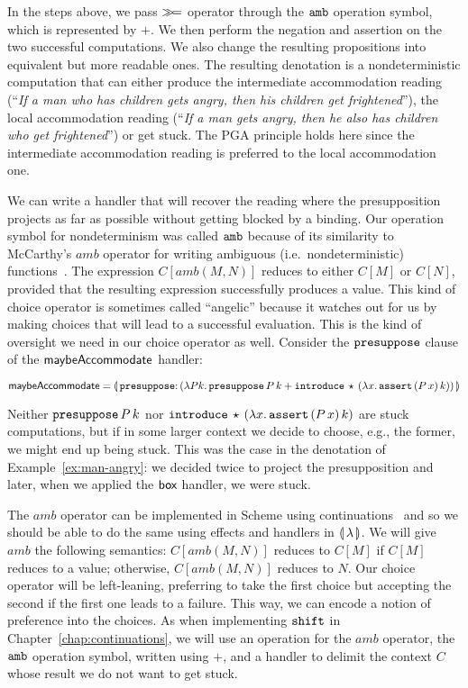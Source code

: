 In the steps above, we pass $\mathbin{\gg\!=}$ operator through the $\mathtt{amb}$
operation symbol, which is represented by $+$. We then perform the negation
and assertion on the two successful computations. We also change the
resulting propositions into equivalent but more readable ones. The
resulting denotation is a nondeterministic computation that can either
produce the intermediate accommodation reading (``\emph{If a man who has
  children gets angry, then his children get frightened}''), the local
accommodation reading (``\emph{If a man gets angry, then he also has
  children who get frightened}'') or get stuck. The PGA principle holds
here since the intermediate accommodation reading is preferred to the local
accommodation one.

We can write a handler that will recover the reading where the
presupposition projects as far as possible without getting blocked by a
binding. Our operation symbol for nondeterminism was called $\mathtt{amb}$
because of its similarity to McCarthy's $amb$ operator for writing
ambiguous (i.e.\ nondeterministic)
functions~\cite{mccarthy1961basis,abelson1996structure}. The expression
$C[amb(M, N)]$ reduces to either $C[M]$ or $C[N]$, provided that the
resulting expression successfully produces a value. This kind of choice
operator is sometimes called ``angelic'' because it watches out for us by
making choices that will lead to a successful evaluation. This is the kind
of oversight we need in our choice operator as well. Consider the
$\mathtt{presuppose}$ clause of the $\textsf{maybeAccommodate}$ handler:

$$
  \maybeAccommodate = \banana{\onto{\op{presuppose}}{(\lam{P k}{
    \app{\op{presuppose}}{P}{k} +
    \app{\op{introduce}}{\star}{(\lam{x}{\app{\op{assert}}{(\ap{P}{x})}{k}})}})}}
$$

Neither $\mathtt{presuppose}\,P\,k$ nor
$\mathtt{introduce}\,\star\,(\lambda x.\, \mathtt{assert}\,(P\,x)\,k)$
are stuck computations, but if in some larger context we decide to choose,
e.g., the former, we might end up being stuck. This was the case in the
denotation of Example~\ref{ex:man-angry}: we decided twice to project the
presupposition and later, when we applied the $\textsf{box}$ handler, we were
stuck.

The $amb$ operator can be implemented in Scheme using
continuations~\cite{sitaram1998teach} and so we should be able to do the
same using effects and handlers in $\llparenthesis \, \lambda \, \rrparenthesis$. We will give $amb$
the following semantics: $C[amb(M, N)]$ reduces to $C[M]$ if $C[M]$ reduces
to a value; otherwise, $C[amb(M, N)]$ reduces to $N$. Our choice operator
will be left-leaning, preferring to take the first choice but accepting the
second if the first one leads to a failure. This way, we can encode a
notion of preference into the choices. As when implementing $\mathtt{shift}$ in
Chapter~\ref{chap:continuations}, we will use an operation for the $amb$
operator, the $\mathtt{amb}$ operation symbol, written using $+$, and a handler
to delimit the context $C$ whose result we do not want to get stuck.

